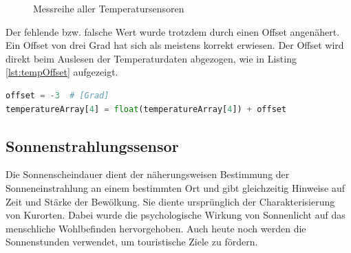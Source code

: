 \begin{figure}[htb!]
	\centering
	\caption{Messreihe aller Temperatursensoren}
	\label{img:tempSensoren}
\end{figure}

\noindent
Der fehlende bzw. falsche Wert wurde trotzdem durch einen Offset angenähert. Ein Offset von drei Grad hat sich als meistens korrekt erwiesen. Der Offset wird direkt beim Auslesen der Temperaturdaten abgezogen, wie in Listing \ref{lst:tempOffset} aufgezeigt.

\vspace{3mm}
\begin{lstlisting}[label=lst:tempOffset,caption=Offset des defekten Temperatusensors, language=Python, style=py]
offset = -3  # [Grad]
temperatureArray[4] = float(temperatureArray[4]) + offset
\end{lstlisting}


\subsection{Sonnenstrahlungssensor}
Die Sonnenscheindauer dient der näherungsweisen Bestimmung der Sonneneinstrahlung an einem bestimmten Ort und gibt gleichzeitig Hinweise auf Zeit und Stärke der Bewölkung. Sie diente ursprünglich der Charakterisierung von Kurorten. Dabei wurde die psychologische Wirkung von Sonnenlicht auf das menschliche Wohlbefinden hervorgehoben. Auch heute noch werden die Sonnenstunden verwendet, um touristische Ziele zu fördern.

